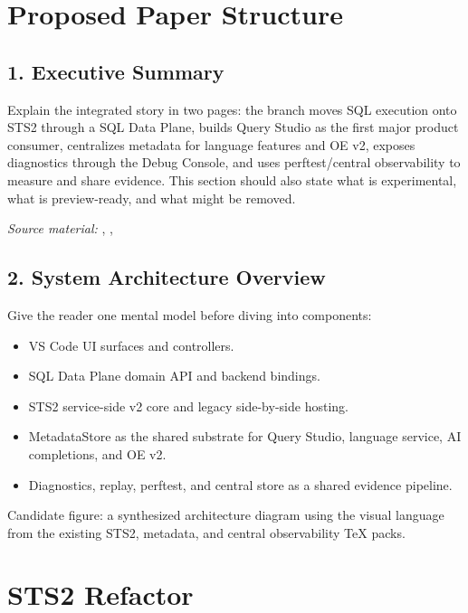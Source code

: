 \documentclass[11pt]{article}
\begin{document}
\section{Proposed Paper Structure}

\subsection{1. Executive Summary}

Explain the integrated story in two pages: the branch moves SQL execution onto STS2 through a SQL Data Plane, builds Query Studio as the first major product consumer, centralizes metadata for language features and OE v2, exposes diagnostics through the Debug Console, and uses perftest/central observability to measure and share evidence.  This section should also state what is experimental, what is preview-ready, and what might be removed.

\noindent\textit{Source material:} , , 

\subsection{2. System Architecture Overview}

Give the reader one mental model before diving into components:

\begin{itemize}
	\item VS Code UI surfaces and controllers.
	\item SQL Data Plane domain API and backend bindings.
	\item STS2 service-side v2 core and legacy side-by-side hosting.
	\item MetadataStore as the shared substrate for Query Studio, language service, AI completions, and OE v2.
	\item Diagnostics, replay, perftest, and central store as a shared evidence pipeline.
\end{itemize}

Candidate figure: a synthesized architecture diagram using the visual language from the existing STS2, metadata, and central observability TeX packs.

\section{STS2 Refactor}
\end{document}
